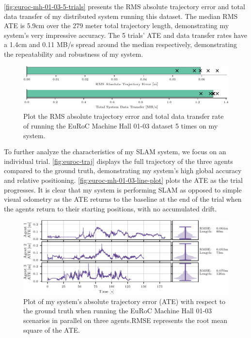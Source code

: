 \autoref{fig:euroc-mh-01-03-5-trials} presents the RMS absolute trajectory error and total data transfer of my distributed system running this dataset. The median RMS ATE is 5.9cm over the 279 meter total trajectory length, demonstrating my system's very impressive accuracy. The 5 trials' ATE and data transfer rates have a 1.4cm and 0.11 MB/s spread around the median respectively, demonstrating the repeatability and robustness of my system.

\begin{figure}[h]
    \centering
    \includegraphics[width=0.8\linewidth]{figures/comparison_apr11_mh_trajectory_b.pdf}

    \caption{Plot the RMS absolute trajectory error and total data transfer rate of running the EuRoC Machine Hall 01-03 dataset 5 times on my system.}
    \label{fig:euroc-mh-01-03-5-trials}
\end{figure}

To further analyze the characteristics of my SLAM system, we focus on an individual trial. \autoref{fig:euroc-traj} displays the full trajectory of the three agents compared to the ground truth, demonstrating my system's high global accuracy and relative positioning. \autoref{fig:euroc-mh-01-03-line-plot} plots the ATE as the trial progresses. It is clear that my system is performing SLAM as opposed to simple visual odometry as the ATE returns to the baseline at the end of the trial when the agents return to their starting positions, with no accumulated drift.

\begin{figure}[h]
    \centering
    \includegraphics[width=0.9\linewidth]{figures/apr11_mh_trajectory_b_line_plot.pdf}

    \caption{Plot of my system's absolute trajectory error (ATE) with respect to the ground truth when running the EuRoC Machine Hall 01-03 scenarios in parallel on three agents.\captionbreak RMSE represents the root mean square of the ATE.}
    \label{fig:euroc-mh-01-03-line-plot}
\end{figure}

